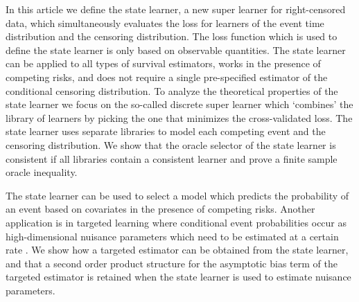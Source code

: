 \documentclass[a4,danish]{article}
\begin{document}
In this article we define the state learner, a new super learner for
right-censored data, which simultaneously evaluates the loss for learners of the
event time distribution and the censoring distribution. The loss function which
is used to define the state learner is only based on observable
quantities. The state learner can be applied to all types of survival
estimators, works in the presence of competing risks, and does not require a
single pre-specified estimator of the conditional censoring distribution. To
analyze the theoretical properties of the state learner we focus on the
so-called discrete super learner which `combines' the library of
learners by picking the one that minimizes the cross-validated loss. The state
learner uses separate libraries to model each competing event and the censoring
distribution. We show that the oracle selector of the state learner is
consistent if all libraries contain a consistent learner and prove a finite
sample oracle inequality.

The state learner can be used to select a model which predicts the probability
of an event based on covariates in the presence of competing risks. Another
application is in targeted learning where conditional event probabilities occur
as high-dimensional nuisance parameters which need to be estimated at a certain
rate \citep{van2011targeted, rytgaard2021estimation, rytgaard2022targeted}. We
show how a targeted estimator can be obtained from the state learner, and that a
second order product structure for the asymptotic bias term of the targeted
estimator is retained when the state learner is used to estimate nuisance
parameters.

\end{document}
